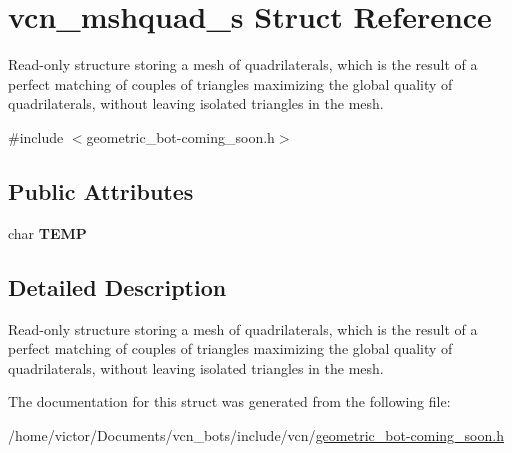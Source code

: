 \hypertarget{structvcn__mshquad__s}{\section{vcn\+\_\+mshquad\+\_\+s Struct Reference}
\label{structvcn__mshquad__s}
}


Read-\/only structure storing a mesh of quadrilaterals, which is the result of a perfect matching of couples of triangles maximizing the global quality of quadrilaterals, without leaving isolated triangles in the mesh.  




{\ttfamily \#include $<$geometric\+\_\+bot-\/coming\+\_\+soon.\+h$>$}

\subsection*{Public Attributes}
\begin{DoxyCompactItemize}
\item 
\hypertarget{structvcn__mshquad__s_ac96e8b46ed1fc98e2db62add056298e6}{char {\bfseries T\+E\+M\+P}}\label{structvcn__mshquad__s_ac96e8b46ed1fc98e2db62add056298e6}

\end{DoxyCompactItemize}


\subsection{Detailed Description}
Read-\/only structure storing a mesh of quadrilaterals, which is the result of a perfect matching of couples of triangles maximizing the global quality of quadrilaterals, without leaving isolated triangles in the mesh. 

The documentation for this struct was generated from the following file\+:\begin{DoxyCompactItemize}
\item 
/home/victor/\+Documents/vcn\+\_\+bots/include/vcn/\hyperlink{geometric__bot-coming__soon_8h}{geometric\+\_\+bot-\/coming\+\_\+soon.\+h}\end{DoxyCompactItemize}

